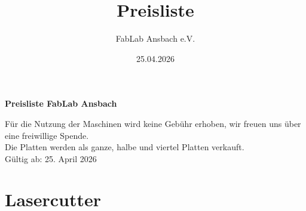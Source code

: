 \title{Preisliste}
\author{FabLab Ansbach e.V.}
\date{25.04.2026}



\makeatletter
\newcommand*{\thead}[1]{\multicolumn{1}{c}{\bfseries #1}}
\makeatother



\begin{center}
    \LARGE\textbf{Preisliste FabLab Ansbach}
\end{center}
Für die Nutzung der Maschinen wird keine Gebühr erhoben, wir freuen uns über eine freiwillige Spende.\\
Die Platten werden als ganze, halbe und viertel Platten verkauft.\\
Gültig ab: 25. April 2026\\
\section{Lasercutter}
